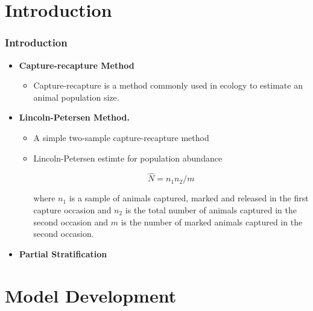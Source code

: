 \documentclass{beamer}
\begin{document}
\section{Introduction} 
\begin{frame}\frametitle{Introduction} %
{\scriptsize 
\begin{itemize}
\item \textbf{Capture-recapture Method}

	\begin{itemize}
	\item  {\scriptsize Capture-recapture is a method commonly used in ecology to estimate an animal population size.}
	\end{itemize}
\item \textbf{Lincoln-Petersen Method.}
	\begin{itemize}
	\item {\scriptsize A simple two-sample capture-recapture method}
	\item  {\scriptsize Lincoln-Petersen estimte for population abundance }

	$$\hat{N} = n_{1}n_{2}/m$$

	{\scriptsize where $n_{1}$ is a sample of animals captured, marked and released in the first capture occasion and $n_{2}$ is the total number of animals captured in the second
	occasion and $m$ is the number of marked  animals captured in the second occasion.}
	\end{itemize}
\item \textbf{Partial Stratification}
\end{itemize}

}

\end{frame}

\section{Model Development}
\end{document}
